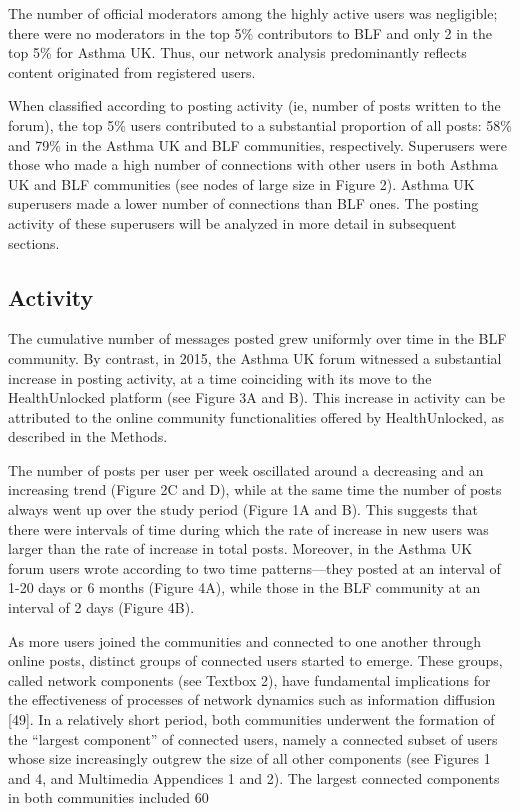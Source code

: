 The number of official moderators among the highly active users was negligible; there were no moderators in the top 5\% contributors to BLF and only 2 in the top 5\% for Asthma UK. Thus, our network analysis predominantly reflects content originated from registered users.

When classified according to posting activity (ie, number of posts written to the forum), the top 5\% users contributed to a substantial proportion of all posts: 58\% and 79\% in the Asthma UK and BLF communities, respectively. Superusers were those who made a high number of connections with other users in both Asthma UK and BLF communities (see nodes of large size in Figure 2). Asthma UK superusers made a lower number of connections than BLF ones. The posting activity of these superusers will be analyzed in more detail in subsequent sections.



\subsection{Activity}

The cumulative number of messages posted grew uniformly over time in the BLF community. By contrast, in 2015, the Asthma UK forum witnessed a substantial increase in posting activity, at a time coinciding with its move to the HealthUnlocked platform (see Figure 3A and B). This increase in activity can be attributed to the online community functionalities offered by HealthUnlocked, as described in the Methods.

The number of posts per user per week oscillated around a decreasing and an increasing trend (Figure 2C and D), while at the same time the number of posts always went up over the study period (Figure 1A and B). This suggests that there were intervals of time during which the rate of increase in new users was larger than the rate of increase in total posts. Moreover, in the Asthma UK forum users wrote according to two time patterns—they posted at an interval of 1-20 days or 6 months (Figure 4A), while those in the BLF community at an interval of 2 days (Figure 4B).

As more users joined the communities and connected to one another through online posts, distinct groups of connected users started to emerge. These groups, called network components (see Textbox 2), have fundamental implications for the effectiveness of processes of network dynamics such as information diffusion [49]. In a relatively short period, both communities underwent the formation of the “largest component” of connected users, namely a connected subset of users whose size increasingly outgrew the size of all other components (see Figures 1 and 4, and Multimedia Appendices 1 and 2). The largest connected components in both communities included 60%

